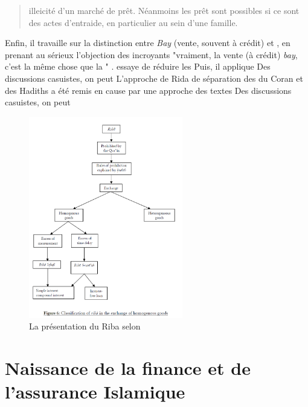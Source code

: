\begin{quote}
    \item illeicité d'un marché de prêt. Néanmoins les prêt sont possibles si ce sont des actes d'entraide, en particulier au sein d'une famille.
    \
    
\end{quote}
Enfin, il travaille sur la distinction entre \emph{Bay} (vente, souvent à crédit) et \riba, en prenant au sérieux l'objection des incroyants "vraiment, la vente (à crédit) \emph{bay}, c'est la même chose que la \riba "
.  essaye de réduire les  Puis, il applique Des discussions casuistes, on peut 
L'approche de Rida de séparation des \riba du Coran et des Hadiths a été remis en cause par une approche des textes \cite{Siddique:DemystifyingRiba}
Des discussions casuistes, on peut 
 \begin{figure}[h!]
     \centering
      \includegraphics[width=0.6\textwidth]{CourantsIslamContemporain/ImagesCourantsIslamContemporain/RibahomogeneousGoods}
      \caption{La présentation du Riba selon \cite{Siddique:DemystifyingRiba}}
     \label{fig:MinorityRiba}
 \end{figure}
 

\section{Naissance de la finance et de l'assurance Islamique}

